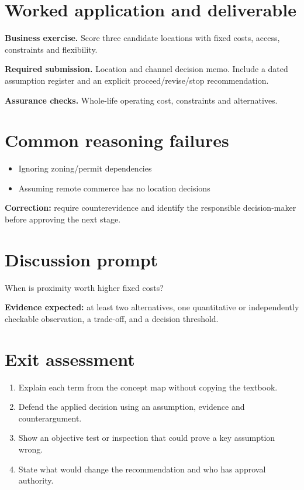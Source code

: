 \documentclass[11pt,letterpaper]{article}
\begin{document}
\section{Worked application and deliverable}
\textbf{Business exercise.} Score three candidate locations with fixed costs, access, constraints and flexibility.\par\textbf{Required submission.} Location and channel decision memo. Include a dated assumption register and an explicit proceed/revise/stop recommendation.\par\textbf{Assurance checks.} Whole-life operating cost, constraints and alternatives.
\section{Common reasoning failures}
\begin{itemize}[leftmargin=*,itemsep=3pt]
\item Ignoring zoning/permit dependencies
\item Assuming remote commerce has no location decisions
\end{itemize}
\noindent\textbf{Correction:} require counterevidence and identify the responsible decision-maker before approving the next stage.
\section{Discussion prompt}
When is proximity worth higher fixed costs?\par\medskip\textbf{Evidence expected:} at least two alternatives, one quantitative or independently checkable observation, a trade-off, and a decision threshold.
\section{Exit assessment}
\begin{enumerate}[leftmargin=*,itemsep=5pt]
\item Explain each term from the concept map without copying the textbook.
\item Defend the applied decision using an assumption, evidence and counterargument.
\item Show an objective test or inspection that could prove a key assumption wrong.
\item State what would change the recommendation and who has approval authority.
\end{enumerate}

\end{document}
